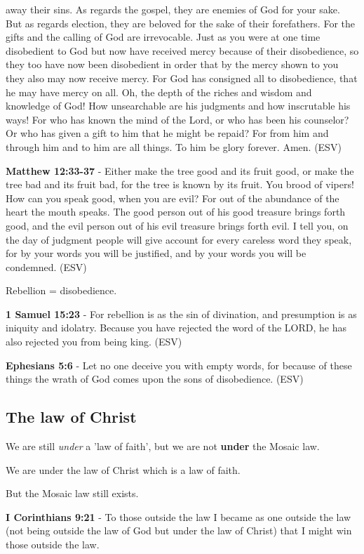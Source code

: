 \documentclass[11pt]{article}
\begin{document}
away their sins. As regards the gospel, they are enemies of God for your sake. But as regards election, they are beloved for the sake of their forefathers. For the gifts and the calling of God are irrevocable. Just as you were at one time disobedient to God but now have received mercy because of their disobedience, so they too have now been disobedient in order that by the mercy shown to you they also may now receive mercy. For God has consigned all to disobedience, that he may have mercy on all. Oh, the depth of the riches and wisdom and knowledge of God! How unsearchable are his judgments and how inscrutable his ways! For who has known the mind of the Lord, or who has been his counselor? Or who has given a gift to him that he might be repaid? For from him and through him and to him are all things. To him be glory forever. Amen. (ESV)

\textbf{Matthew 12:33-37} -  Either make the tree good and its fruit good, or make the tree bad and its fruit bad, for the tree is known by its fruit.  You brood of vipers! How can you speak good, when you are evil?  For out of the abundance of the heart the mouth speaks.  The good person out of his good treasure brings forth good, and the evil person out of his evil treasure brings forth evil.  I tell you, on the day of judgment people will give account for every careless word they speak, for by your words you will be justified, and by your words you will be condemned.  (ESV)

Rebellion = disobedience.

\textbf{1 Samuel 15:23} -  For rebellion is as the sin of divination, and presumption is as iniquity and idolatry.  Because you have rejected the word of the LORD, he has also rejected you from being king.  (ESV)

\textbf{Ephesians 5:6} - Let no one deceive you with empty words, for because of these things the wrath of God comes upon the sons of disobedience.  (ESV)

\subsection{The law of Christ}
\label{sec:org7239e9c}
We are still \emph{under} a 'law of faith', but we are not \textbf{under} the Mosaic law.

We are under the law of Christ which is a law of faith.

But the Mosaic law still exists.

\textbf{I Corinthians 9:21} - To those outside the law I became as one outside the law (not being outside the law of God but under the law of Christ) that I might win those outside the law.
\end{document}
